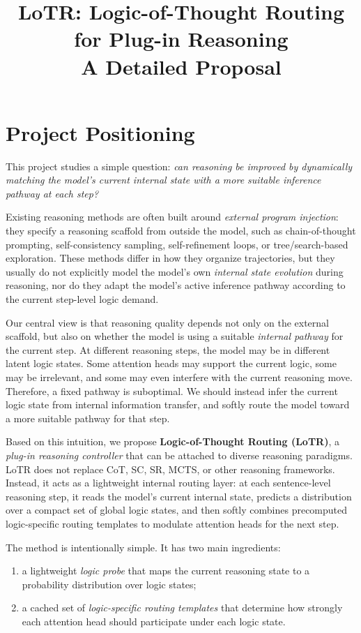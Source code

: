 \documentclass[11pt]{article}
\title{\textbf{LoTR: Logic-of-Thought Routing for Plug-in Reasoning}\\
\vspace{0.3em}
\large A Detailed Proposal}
\author{}
\date{}
\begin{document}
\maketitle

\section{Project Positioning}

This project studies a simple question: \emph{can reasoning be improved by dynamically matching the model's current internal state with a more suitable inference pathway at each step?}

Existing reasoning methods are often built around \emph{external program injection}: they specify a reasoning scaffold from outside the model, such as chain-of-thought prompting, self-consistency sampling, self-refinement loops, or tree/search-based exploration. These methods differ in how they organize trajectories, but they usually do not explicitly model the model's own \emph{internal state evolution} during reasoning, nor do they adapt the model's active inference pathway according to the current step-level logic demand.

Our central view is that reasoning quality depends not only on the external scaffold, but also on whether the model is using a suitable \emph{internal pathway} for the current step. At different reasoning steps, the model may be in different latent logic states. Some attention heads may support the current logic, some may be irrelevant, and some may even interfere with the current reasoning move. Therefore, a fixed pathway is suboptimal. We should instead infer the current logic state from internal information transfer, and softly route the model toward a more suitable pathway for that step.

Based on this intuition, we propose \textbf{Logic-of-Thought Routing (LoTR)}, a \emph{plug-in reasoning controller} that can be attached to diverse reasoning paradigms. LoTR does not replace CoT, SC, SR, MCTS, or other reasoning frameworks. Instead, it acts as a lightweight internal routing layer: at each sentence-level reasoning step, it reads the model's current internal state, predicts a distribution over a compact set of global logic states, and then softly combines precomputed logic-specific routing templates to modulate attention heads for the next step.

The method is intentionally simple. It has two main ingredients:
\begin{enumerate}[leftmargin=1.5em]
    \item a lightweight \emph{logic probe} that maps the current reasoning state to a probability distribution over logic states;
    \item a cached set of \emph{logic-specific routing templates} that determine how strongly each attention head should participate under each logic state.
\end{enumerate}
\end{document}
